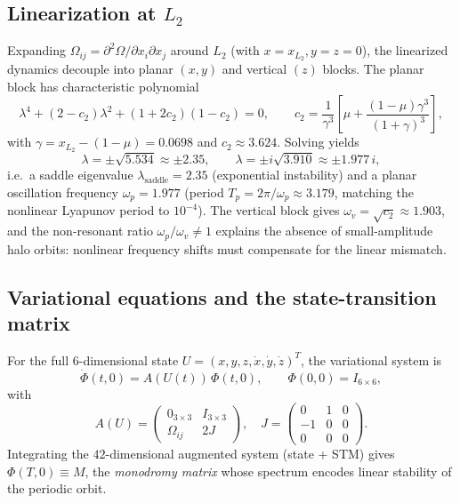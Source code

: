 \documentclass[11pt,a4paper]{article}
\begin{document}
\subsection{Linearization at $L_2$}
Expanding $\Omega_{ij} = \partial^2 \Omega /\partial x_i \partial x_j$ around $L_2$ (with $x = x_{L_2}, y = z = 0$), the linearized dynamics decouple into planar $(x,y)$ and vertical $(z)$ blocks. The planar block has characteristic polynomial
\begin{equation}
\lambda^4 + (2 - c_2)\lambda^2 + (1+2c_2)(1-c_2) = 0, \qquad
c_2 = \frac{1}{\gamma^3}\!\left[\mu + \frac{(1-\mu)\gamma^3}{(1+\gamma)^3}\right],
\end{equation}
with $\gamma = x_{L_2} - (1-\mu) = 0.0698$ and $c_2 \approx 3.624$. Solving yields
\begin{equation}
\lambda = \pm \sqrt{5.534} \approx \pm 2.35, \qquad
\lambda = \pm i \sqrt{3.910} \approx \pm 1.977\,i,
\end{equation}
i.e.\ a saddle eigenvalue $\lambda_{\text{saddle}} = 2.35$ (exponential instability) and a planar oscillation frequency $\omega_p = 1.977$ (period $T_p = 2\pi/\omega_p \approx 3.179$, matching the nonlinear Lyapunov period to $10^{-4}$). The vertical block gives $\omega_v = \sqrt{c_2} \approx 1.903$, and the non-resonant ratio $\omega_p/\omega_v \neq 1$ explains the absence of small-amplitude halo orbits: nonlinear frequency shifts must compensate for the linear mismatch.

\subsection{Variational equations and the state-transition matrix}
For the full 6-dimensional state $U = (x,y,z,\dot x, \dot y, \dot z)^T$, the variational system is
\begin{equation}
\dot \Phi(t,0) = A(U(t))\,\Phi(t,0), \qquad \Phi(0,0) = I_{6\times 6},
\end{equation}
with
\begin{equation}
A(U) =
\begin{pmatrix}
0_{3\times 3} & I_{3\times 3} \\
\Omega_{ij} & 2J
\end{pmatrix},
\quad J = \begin{pmatrix} 0 & 1 & 0 \\ -1 & 0 & 0 \\ 0 & 0 & 0 \end{pmatrix}.
\end{equation}
Integrating the $42$-dimensional augmented system (state + STM) gives $\Phi(T,0) \equiv M$, the \emph{monodromy matrix} whose spectrum encodes linear stability of the periodic orbit.
\end{document}
